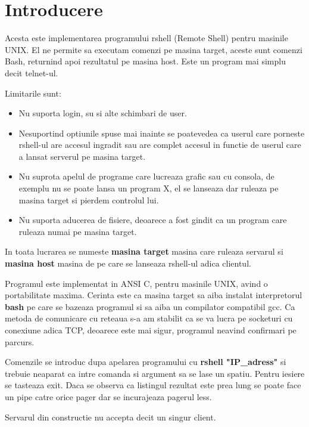 \chapter{Introducere}

\hspace{5mm}Acesta este implementarea programului rshell (Remote Shell)
pentru masinile UNIX. El ne permite sa executam comenzi pe masina target,
aceste sunt comenzi Bash, returnind apoi rezultatul pe masina host. Este un
program mai simplu decit telnet-ul.

Limitarile sunt:
\begin{itemize}
\item Nu suporta login, su si alte schimbari de user.
\item Nesuportind optiunile spuse mai inainte se poatevedea ca userul care
porneste rshell-ul are accesul ingradit sau are complet accesul in functie
de userul care a lansat serverul pe masina target.
\item Nu suprota apelul de programe care lucreaza grafic sau cu consola, de
exemplu nu se poate lansa un program X, el se lanseaza dar ruleaza pe masina
target si pierdem controlul lui.
\item Nu suporta aducerea de fisiere, deoarece a fost gindit ca un program
care ruleaza numai pe masina target.
\end{itemize}

In toata lucrarea se numeste {\bf masina target} masina care ruleaza
servarul si {\bf masina host} masina de pe care se lanseaza rshell-ul adica
clientul.

Programul este implementat in ANSI C, pentru masinile UNIX, avind o
portabilitate maxima. Cerinta este ca masina target sa aiba instalat
interpretorul {\bf bash} pe care se bazeaza programul si sa aiba un
compilator compatibil gcc. Ca metoda de comunicare cu reteaua s-a am
stabilit ca se va lucra pe socketuri cu conexiune adica TCP, deoarece este
mai sigur, programul neavind confirmari pe parcurs.

Comenzile se introduc dupa apelarea programului cu {\bf rshell "IP\_adress"}
si trebuie neaparat ca intre comanda si argument sa se lase un spatiu.
Pentru iesiere se tasteaza exit. Daca se observa ca listingul rezultat este
prea lung se poate face un pipe catre orice pager dar se incurajeaza pagerul
less.

Servarul din constructie nu accepta decit un singur client.